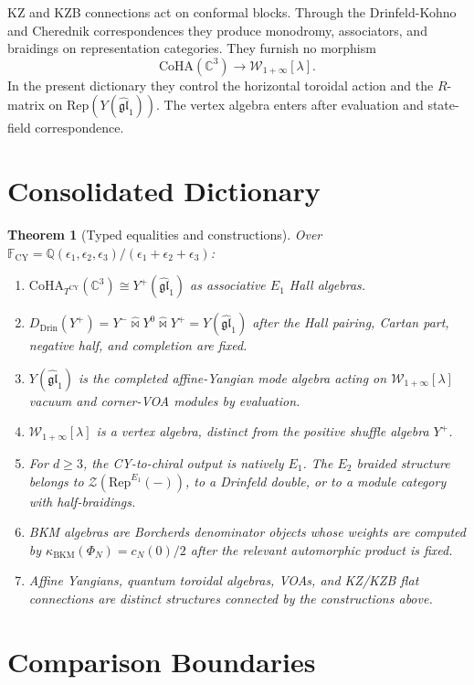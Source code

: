 \documentclass[11pt]{article}
\newtheorem{theorem}{Theorem}[section]
\providecommand{\CoHA}{\mathrm{CoHA}}
\providecommand{\gglone}{\widehat{\mathfrak{gl}}_{1}}
\providecommand{\Yp}{Y^{+}}
\providecommand{\Ym}{Y^{-}}
\providecommand{\Yz}{Y^{0}}
\providecommand{\YFull}{Y}
\providecommand{\Wilpha}{\mathcal{W}_{1+\infty}}
\providecommand{\CY}{\mathrm{CY}}
\providecommand{\Eone}{E_1}
\providecommand{\Etwo}{E_2}
\providecommand{\Rep}{\mathrm{Rep}}
\begin{document}
KZ and KZB connections act on conformal blocks. Through the
Drinfeld-Kohno and Cherednik correspondences they produce monodromy,
associators, and braidings on representation categories. They furnish no
morphism
\[
\CoHA(\mathbb{C}^3)\longrightarrow\Wilpha[\lambda].
\]
In the present dictionary they control the horizontal toroidal action
and the $R$-matrix on $\Rep(\YFull(\gglone))$. The vertex algebra enters
after evaluation and state-field correspondence.

\section{Consolidated Dictionary}

\begin{theorem}[Typed equalities and constructions]
\label{thm:consolidated-dictionary}
Over
$\mathbb{F}_{\CY}=\mathbb{Q}(\epsilon_1,\epsilon_2,\epsilon_3)/
(\epsilon_1+\epsilon_2+\epsilon_3)$:
\begin{enumerate}
\item $\CoHA_{T^{\CY}}(\mathbb{C}^3)\cong\Yp(\gglone)$ as
associative $\Eone$ Hall algebras.
\item $D_{\mathrm{Drin}}(\Yp)=\Ym\widehat{\bowtie}\Yz
\widehat{\bowtie}\Yp=\YFull(\gglone)$ after the Hall pairing,
Cartan part, negative half, and completion are fixed.
\item $\YFull(\gglone)$ is the completed affine-Yangian mode algebra
acting on $\Wilpha[\lambda]$ vacuum and corner-VOA modules by
evaluation.
\item $\Wilpha[\lambda]$ is a vertex algebra, distinct from the positive
shuffle algebra $\Yp$.
\item For $d\geq 3$, the CY-to-chiral output is natively $\Eone$.
The $\Etwo$ braided structure belongs to
$\mathcal{Z}(\Rep^{\Eone}(-))$, to a Drinfeld double, or to a module
category with half-braidings.
\item BKM algebras are Borcherds denominator objects whose weights are
computed by $\kappa_{\mathrm{BKM}}(\Phi_N)=c_N(0)/2$ after the
relevant automorphic product is fixed.
\item Affine Yangians, quantum toroidal algebras, VOAs, and KZ/KZB flat
connections are distinct structures connected by the constructions
above.
\end{enumerate}
\end{theorem}

\section{Comparison Boundaries}
\end{document}
